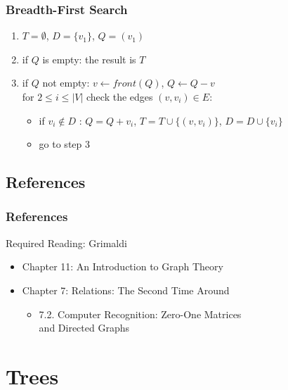 \documentclass[dvipsnames]{beamer}
\begin{document}
\begin{frame}
  \frametitle{Breadth-First Search}

  \begin{enumerate}
    \item $T=\emptyset$, $D=\{v_1\}$, $Q=(v_1)$

    \pause
    \item if $Q$ is empty: the result is $T$
    \item if $Q$ not empty: $v \leftarrow front(Q)$, $Q \leftarrow Q - v$\\
      for $2 \leq i \leq |V|$ check the edges $(v,v_i) \in E$:
    \begin{itemize}
      \item if $v_i \notin D$ : $Q = Q + v_i$, $T = T \cup \{(v,v_i)\}$,
        $D=D \cup \{v_i\}$
       \item go to step 3
    \end{itemize}
  \end{enumerate}
\end{frame}


\subsection*{References}

\begin{frame}
  \frametitle{References}

  \begin{block}{Required Reading: Grimaldi}
    \begin{itemize}
      \item Chapter 11: \alert{An Introduction to Graph Theory}

      \item Chapter 7: Relations: The Second Time Around
      \begin{itemize}
        \item 7.2. \alert{Computer Recognition: Zero-One Matrices\\
                          and Directed Graphs}
      \end{itemize}
    \end{itemize}
  \end{block}
\end{frame}

\section{Trees}
\end{document}
